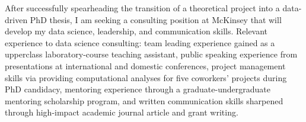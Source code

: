 

\begin{cventries}


\fontsize{10pt}{1em}\bodyfontlight\upshape\color{black}\justify
After successfully spearheading the transition of a theoretical project into a data-driven PhD thesis, I am seeking a consulting position at McKinsey that will develop my data science, leadership, and communication skills. Relevant experience to data science consulting: team leading experience gained as a upperclass laboratory-course teaching assistant, public speaking experience from presentations at international and domestic conferences, project management skills via providing computational analyses for five coworkers' projects during PhD candidacy, mentoring experience through a graduate-undergraduate mentoring scholarship program, and written communication skills sharpened through high-impact academic journal article and grant writing.
    
\vspace{-2.0mm}
\end{cventries}
